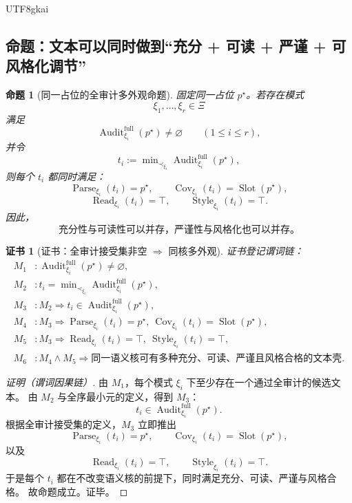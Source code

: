 \documentclass[12pt]{article}
\newtheorem{proposition}{命题}[section]
\newtheorem{Certificate}{证书}[section]
\newcommand{\Parse}{\operatorname{Parse}}
\newcommand{\Audit}{\operatorname{Audit}}
\newcommand{\Style}{\operatorname{Style}}
\begin{document}
\begin{CJK*}{UTF8}{gkai}
\subsection{命题：文本可以同时做到“充分 + 可读 + 严谨 + 可风格化调节”}
\label{subsec:tex37-ch5-prop-multistyle}

\begin{proposition}[同一占位的全审计多外观命题]
\label{prop:tex37-ch5-multistyle}
固定同一占位 $p^\star$。若存在模式
\[
  \xi_1,\dots,\xi_r\in\Xi
\]
满足
\[
  \Audit^{\mathrm{full}}_{\xi_i}(p^\star)\neq\varnothing
  \qquad
  (1\le i\le r),
\]
并令
\[
  t_i
  :=
  \min\nolimits_{\prec_{\xi_i}}
  \Audit^{\mathrm{full}}_{\xi_i}(p^\star),
\]
则每个 $t_i$ 都同时满足：
\[
  \Parse_{\xi_i}(t_i)=p^\star,
  \qquad
  \operatorname{Cov}_{\xi_i}(t_i)=\operatorname{Slot}(p^\star),
\]
\[
  \operatorname{Read}_{\xi_i}(t_i)=\top,
  \qquad
  \Style_{\xi_i}(t_i)=\top.
\]
因此，
\[
  \boxed{
    \text{充分性与可读性可以并存，严谨性与风格化也可以并存。}
  }
\]
\end{proposition}

\begin{Certificate}[证书：全审计接受集非空 $\Rightarrow$ 同核多外观]
\label{cert:tex37-ch5-multistyle}
证书登记谓词链：
\[
\begin{aligned}
  M_1 &: \Audit^{\mathrm{full}}_{\xi_i}(p^\star)\neq\varnothing,\\
  M_2 &: t_i=\min\nolimits_{\prec_{\xi_i}}\Audit^{\mathrm{full}}_{\xi_i}(p^\star),\\
  M_3 &: M_2\Rightarrow t_i\in \Audit^{\mathrm{full}}_{\xi_i}(p^\star),\\
  M_4 &: M_3\Rightarrow \Parse_{\xi_i}(t_i)=p^\star,\ \operatorname{Cov}_{\xi_i}(t_i)=\operatorname{Slot}(p^\star),\\
  M_5 &: M_3\Rightarrow \operatorname{Read}_{\xi_i}(t_i)=\top,\ \Style_{\xi_i}(t_i)=\top,\\
  M_6 &: M_4\wedge M_5\Rightarrow \text{同一语义核可有多种充分、可读、严谨且风格合格的文本壳}.
\end{aligned}
\]
\end{Certificate}

\begin{proof}[证明（谓词因果链）]
由 $M_1$，每个模式 $\xi_i$ 下至少存在一个通过全审计的候选文本。
由 $M_2$ 与全序最小元的定义，得到 $M_3$：
\[
  t_i\in \Audit^{\mathrm{full}}_{\xi_i}(p^\star).
\]
根据全审计接受集的定义，$M_3$ 立即推出
\[
  \Parse_{\xi_i}(t_i)=p^\star,
  \qquad
  \operatorname{Cov}_{\xi_i}(t_i)=\operatorname{Slot}(p^\star),
\]
以及
\[
  \operatorname{Read}_{\xi_i}(t_i)=\top,
  \qquad
  \Style_{\xi_i}(t_i)=\top.
\]
于是每个 $t_i$ 都在不改变语义核的前提下，同时满足充分、可读、严谨与风格合格。
故命题成立。证毕。
\end{proof}


\end{CJK*}
\end{document}
